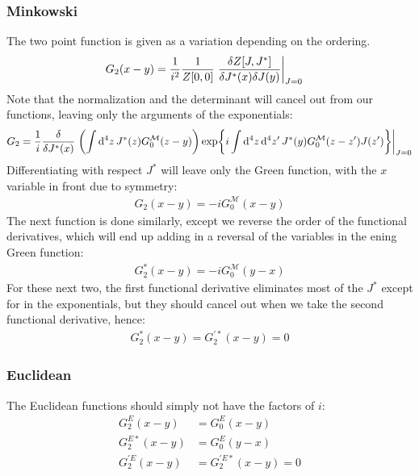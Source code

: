 \documentclass[12pt]{article}
\begin{document}
\subsubsection{Minkowski}
The two point function is given as a variation depending on the ordering.
\begin{align*}
  G_2(x-y)&=\frac{1}{i^2}\frac{1}{Z[0,0]}
  \eval{\frac{\delta Z[J,J^*]}{\delta J^*(x)\delta J(y)}}_{J=0}
\end{align*}
Note that the normalization and the determinant will cancel out from our functions, leaving only the arguments of the exponentials:
\begin{align*}
  G_2=\frac{1}{i}\fdv{J^*(x)}\eval{
  \qty(\int\dd[4]{z}J^*(z)G_0^{\mathcal{M}}(z-y))
  \exp{i\int\dd[4]{z}\dd[4]{z'}J^*(y)G_0^{\mathcal{M}}(z-z')J(z')}}_{J=0}
\end{align*}
Differentiating with respect $J^*$ will leave only the Green function, with the $x$ variable in front due to symmetry:
\begin{align*}
  \boxed{G_2(x-y)=-iG_0^{\mathcal{M}}(x-y)}
\end{align*}
The next function is done similarly, except we reverse the order of the functional derivatives, which will end up adding in a reversal of the variables in the ening Green function:
\begin{align*}
  \boxed{G_2^*(x-y)=-iG_0^{\mathcal{M}}(y-x)}
\end{align*}
For these next two, the first functional derivative eliminates most of the $J^*$ except for in the exponentials, but they should cancel out when we take the second functional derivative, hence:
\begin{align*}
  \boxed{G_2^*(x-y)=G_2^{\prime*}(x-y)=0}
\end{align*}
\subsubsection{Euclidean}
The Euclidean functions should simply not have the factors of $i$:
\begin{equation*}
  \boxed{
    \begin{aligned}
      G_2^E(x-y)&=G_0^E(x-y)\\
      G_2^{E*}(x-y)&=G_0^E(y-x)\\
      G_2^{\prime E}(x-y)&=G_2^{\prime E*}(x-y)=0
    \end{aligned}
  }
\end{equation*}
\end{document}
